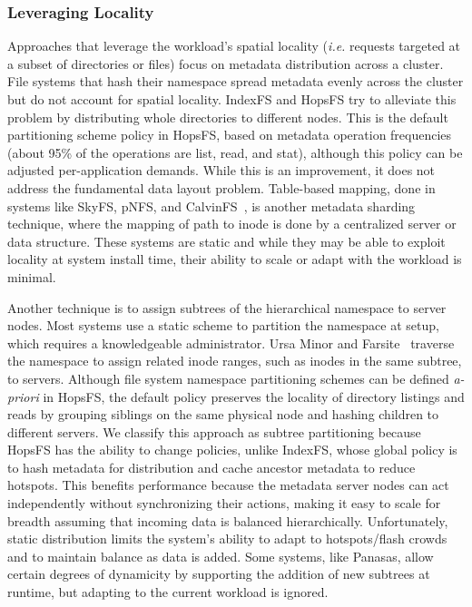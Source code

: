 \subsubsection{Leveraging Locality}

Approaches that leverage the workload's spatial locality ({\it i.e.} requests
targeted at a subset of directories or files) focus on metadata distribution
across a cluster. File systems that hash their namespace spread metadata evenly
across the cluster but do not account for spatial locality.  IndexFS and HopsFS
try to alleviate this problem by distributing whole directories to different
nodes. This is the default partitioning scheme policy in HopsFS, based on
metadata operation frequencies (about 95\% of the operations are list, read, and
stat), although this policy can be adjusted per-application demands.  While
this is an improvement, it does not address the fundamental data layout
problem.  Table-based mapping, done in systems like SkyFS, pNFS, and
CalvinFS~\cite{thomson:fast2015-calvinfs}, is another metadata sharding
technique, where the mapping of path to inode is done by a centralized server
or data structure. These systems are static and while they may be able to
exploit locality at system install time, their ability to scale or adapt with
the workload is minimal.

Another technique is to assign subtrees of the hierarchical namespace to server
nodes. Most systems use a static scheme to partition the namespace at setup,
which requires a knowledgeable administrator. Ursa Minor and
Farsite~\cite{doucer:osdi2006-farsite-dir} traverse the namespace to assign
related inode ranges, such as inodes in the same subtree, to servers. Although
file system namespace partitioning schemes can be defined {\it a-priori} in
HopsFS, the default policy preserves the locality of directory listings and
reads by grouping siblings on the same physical node and hashing children to
different servers.  We classify this approach as subtree partitioning because
HopsFS has the ability to change policies, unlike IndexFS, whose global policy
is to hash metadata for distribution and cache ancestor metadata to reduce
hotspots.  This benefits performance because the metadata server nodes can act
independently without synchronizing their actions, making it easy to scale for
breadth assuming that incoming data is balanced hierarchically.  Unfortunately,
static distribution limits the system's ability to adapt to hotspots/flash
crowds and to maintain balance as data is added.  Some systems, like Panasas,
allow certain degrees of dynamicity by supporting the addition of new subtrees
at runtime, but adapting to the current workload is ignored.

